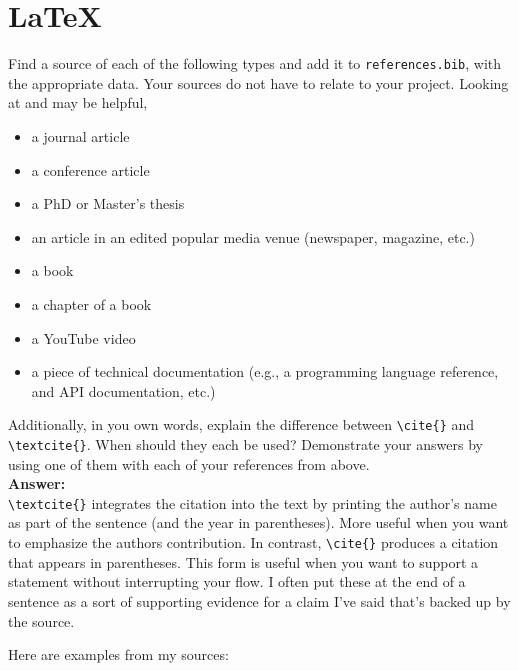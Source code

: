 \documentclass[10pt,twocolumn]{article}
\begin{document}
\section{\LaTeX}

Find a source of each of the following types and add it to \texttt{references.bib}, with the appropriate data. Your sources do not have to relate to your project. Looking at \textcite{OverleafBibliographyManagement} and \textcite{WikipediaBibtex} may be helpful,

\begin{itemize}
\item a journal article
\item a conference article
\item a PhD or Master's thesis
\item an article in an edited popular media venue (newspaper, magazine, etc.)
\item a book
\item a chapter of a book
\item a YouTube video
\item a piece of technical documentation (e.g., a programming language reference, and API documentation, etc.)
\end{itemize}

Additionally, in you own words, explain the difference between \texttt{{\textbackslash}cite\{\}} and \texttt{{\textbackslash}textcite\{\}}. When should they each be used? Demonstrate your answers by using one of them with each of your references from above.\\
\textbf{Answer:}\\
\texttt{\textbackslash textcite\{\}} integrates the citation into the text by printing the author’s name as part of the sentence (and the year in parentheses). More useful when you want to emphasize the authors contribution. In contrast, \texttt{{\textbackslash}cite\{\}} produces a citation that appears in parentheses. This form is useful when you want to support a statement without interrupting your flow. I often put these at the end of a sentence as a sort of supporting evidence for a claim I've said that's backed up by the source.

Here are examples from my sources:\\
\end{document}
